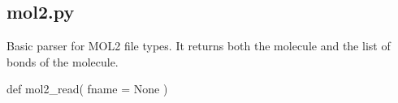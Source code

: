 \normalsize
\subsection[mol2]{mol2.py}
Basic parser for MOL2 file types. It returns both the molecule and the list of bonds of the molecule.
\begin{pyglist}[language=python,fvset={frame=single}]
def mol2_read( fname = None )
\end{pyglist}
